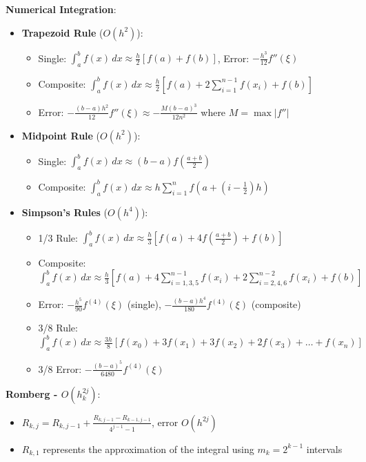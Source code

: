 \documentclass{article}
\begin{document}
\begin{minipage}[t]{0.49\textwidth}
\textbf{Numerical Integration}:
\begin{itemize}\setlength{\itemsep}{-1pt}
\item \textbf{Trapezoid Rule} ($O(h^2)$): 
    \begin{itemize}\setlength{\itemsep}{-2pt}
        \item Single: $\int_a^b f(x)\,dx \approx \frac{h}{2}[f(a) + f(b)]$, Error: $-\frac{h^3}{12}f''(\xi)$
        \item Composite: $\int_a^b f(x)\,dx \approx \frac{h}{2}[f(a) + 2\sum_{i=1}^{n-1}f(x_i) + f(b)]$
        \item Error: $-\frac{(b-a)h^2}{12}f''(\xi) \approx -\frac{M(b-a)^3}{12n^2}$ where $M=\max|f''|$
    \end{itemize}

\item \textbf{Midpoint Rule} ($O(h^2)$):
    \begin{itemize}\setlength{\itemsep}{-2pt}
        \item Single: $\int_a^b f(x)\,dx \approx (b-a)f(\frac{a+b}{2})$
        \item Composite: $\int_a^b f(x)\,dx \approx h\sum_{i=1}^{n}f(a+(i-\frac{1}{2})h)$
    \end{itemize}

\item \textbf{Simpson's Rules} ($O(h^4)$):
    \begin{itemize}\setlength{\itemsep}{-2pt}
        \item 1/3 Rule: $\int_a^b f(x)\,dx \approx \frac{h}{3}[f(a) + 4f(\frac{a+b}{2}) + f(b)]$
        \item Composite: $\int_a^b\!f(x)\,dx \approx \frac{h}{3}[f(a) + 4\sum_{i=1,3,5}^{n-1}\!f(x_i) + 2\sum_{i=2,4,6}^{n-2}\!f(x_i) + f(b)]$
        \item Error: $-\frac{h^5}{90}f^{(4)}(\xi)$ (single), $-\frac{(b-a)h^4}{180}f^{(4)}(\xi)$ (composite)
        \item 3/8 Rule: $\int_a^b\!f(x)\,dx \approx \frac{3h}{8}[f(x_0)+3f(x_1)+3f(x_2)+2f(x_3)+\ldots+f(x_n)]$
        \item 3/8 Error: $-\frac{(b-a)^5}{6480}f^{(4)}(\xi)$
    \end{itemize}
\end{itemize}

\textbf{Romberg - $O(h_k^{2j})$}: 
\begin{itemize}
    \item{$R_{k,j} = R_{k,j-1} + \frac{R_{k,j-1} - R_{k-1,j-1}}{4^{j-1}-1}$, error $O(h^{2j})$}
    \item{$R_{k,1}$ represents the approximation of the integral using $m_k=2^{k-1}$ intervals}
\end{itemize}


\end{minipage}
\end{document}
